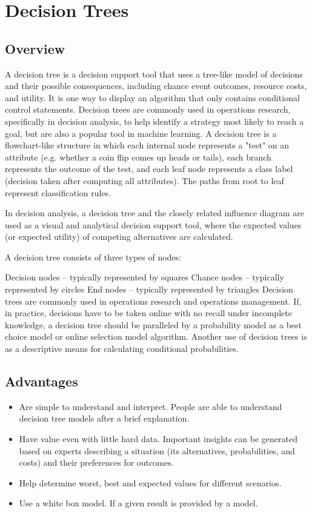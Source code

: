 \documentclass[12pt, a4paper]{report}
\begin{document}
\section{Decision Trees}
\subsection{Overview}
A decision tree is a decision support tool that uses a tree-like model of decisions and their possible consequences, including chance event outcomes, resource costs, and utility. It is one way to display an algorithm that only contains conditional control statements. Decision trees are commonly used in operations research, specifically in decision analysis, to help identify a strategy most likely to reach a goal, but are also a popular tool in machine learning.
A decision tree is a flowchart-like structure in which each internal node represents a "test" on an attribute (e.g. whether a coin flip comes up heads or tails), each branch represents the outcome of the test, and each leaf node represents a class label (decision taken after computing all attributes). The paths from root to leaf represent classification rules.

In decision analysis, a decision tree and the closely related influence diagram are used as a visual and analytical decision support tool, where the expected values (or expected utility) of competing alternatives are calculated.

A decision tree consists of three types of nodes:

Decision nodes – typically represented by squares
Chance nodes – typically represented by circles
End nodes – typically represented by triangles
Decision trees are commonly used in operations research and operations management. If, in practice, decisions have to be taken online with no recall under incomplete knowledge, a decision tree should be paralleled by a probability model as a best choice model or online selection model algorithm. Another use of decision trees is as a descriptive means for calculating conditional probabilities.

\subsection{Advantages}
\begin{itemize}
\item Are simple to understand and interpret. People are able to understand decision tree models after a brief explanation.
\item Have value even with little hard data. Important insights can be generated based on experts describing a situation (its alternatives, probabilities, and costs) and their preferences for outcomes.
\item Help determine worst, best and expected values for different scenarios.
\item Use a white box model. If a given result is provided by a model.
\end{itemize}
\end{document}
